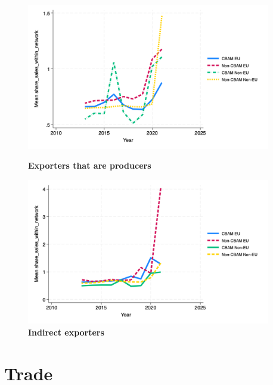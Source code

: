 \documentclass{article}
\begin{document}
\begin{figure}[H]
\centering
\includegraphics[width=0.95\textwidth]{share_sales_within_network_ep.png}
\caption{\textbf{Exporters that are producers}}
\includegraphics[width=0.95\textwidth]{share_sales_within_network_indir.png}
\caption{\textbf{Indirect exporters}}
\end{figure}

\section{Trade}
\end{document}
